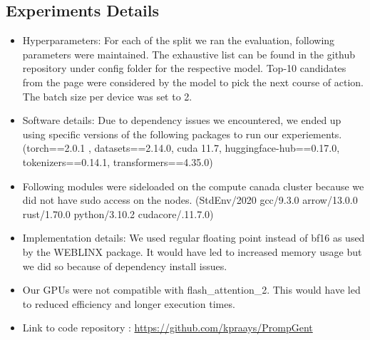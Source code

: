 \documentclass[11pt]{article}
\begin{document}
\subsection{Experiments Details}
\begin{itemize}
    \item Hyperparameters: For each of the split we ran the evaluation, following parameters were maintained. The exhaustive list can be found in the github repository under config folder for the respective model. Top-10 candidates from the page were considered by the model to pick the next course of action. The batch size per device was set to 2.

    \item Software details: Due to dependency issues we encountered, we ended up using specific versions of the following packages to run our experiements. (torch==2.0.1 , datasets==2.14.0, cuda 11.7, huggingface-hub==0.17.0, tokenizers==0.14.1, transformers==4.35.0)
    
    \item Following modules were sideloaded on the compute canada cluster because we did not have sudo access on the nodes. (StdEnv/2020 gcc/9.3.0 arrow/13.0.0 rust/1.70.0 python/3.10.2 cudacore/.11.7.0)

    \item Implementation details: We used regular floating point instead of bf16 as used by the WEBLINX package. It would have led to increased memory usage but we did so because of dependency install issues.

    \item Our GPUs were not compatible with flash\_attention\_2. This would have led to reduced efficiency and longer execution times.

    \item Link to code repository : 
    \url{https://github.com/kpraays/PrompGent}
\end{itemize}
\end{document}
